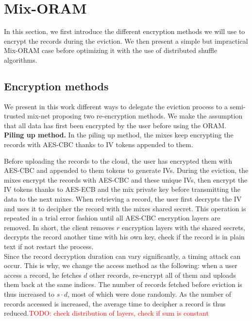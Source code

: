 \documentclass[USenglish,oneside,twocolumn]{article}
\newcommand{\todo}[1]{\textcolor{red}{TODO: #1}}
\begin{document}
\section{Mix-ORAM}\label{Mix-ORAM}
In this section, we first introduce the different encryption methods we will use to encrypt the records during the eviction. We then present a simple but impractical Mix-ORAM case before optimizing it with the use of distributed shuffle algorithms. 
%
\subsection{Encryption methods}\label{Enc}
We present in this work different ways to delegate the eviction process to a semi-trusted mix-net proposing two re-encryption methods.
We make the assumption that all data has first been encrypted by the user before using the ORAM. \\

\textbf{Piling up method.} In the piling up method, the mixes keep encrypting the records with AES-CBC thanks to IV tokens appended to them.

Before uploading the records to the cloud, the user has encrypted them with AES-CBC and appended to them tokens to generate IVs. During the eviction, the mixes encrypt the records with AES-CBC and these unique IVs, then encrypt the IV tokens thanks to AES-ECB and the mix private key before transmitting the data to the next mixes.
When retrieving a record, the user first decrypts the IV and uses it to decipher the record with the mixes shared secret. This operation is repeated in a trial error fashion until all AES-CBC encryption layers are removed. In short, the client removes $r$ encryption layers with the shared secrets, decrypts the record another time with his own key, check if the record is in plain text if not restart the process.\\
Since the record decryption duration can vary significantly, a timing attack can occur. This is why, we change the access method as the following: when a user access a record, he fetches $d$ other records, re-encrypt all of them and uploads them back at the same indices. The number of records fetched before eviction is thus increased to $s\cdot d$, most of which were done randomly. As the number of records accessed is increased, the average time to decipher a record is thus reduced.\todo{check distribution of layers, check if sum is constant} \\
\end{document}
